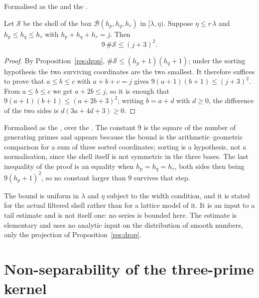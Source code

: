 \documentclass[11pt]{article}
\newcommand{\lo}{\lambda}
\newcommand{\hi}{\eta}
\begin{document}
\noindent Formalised as the
 and the
.

\begin{theorem}\label{res:shell}
Let $\mathcal S$ be the shell of the box $\mathcal B(h_p,h_q,h_r)$ in
$[\lo,\hi)$.  Suppose $\hi\le r\,\lo$ and $h_p\le h_q\le h_r$ with
$h_p+h_q+h_r=j$.  Then
\[
 9\,\#\mathcal S\le(j+3)^{2}.
\]
\end{theorem}

\begin{proof}
By Proposition~\ref{res:drop}, $\#\mathcal S\le(h_p+1)(h_q+1)$; under the
sorting hypothesis the two surviving coordinates are the two smallest.  It
therefore
suffices to prove that $a\le b\le c$ with $a+b+c=j$ gives
$9(a+1)(b+1)\le(j+3)^{2}$.  From $a\le b\le c$ we get $a+2b\le j$, so it is
enough that $9(a+1)(b+1)\le(a+2b+3)^{2}$; writing $b=a+d$ with $d\ge0$, the
difference of the two sides is $d(3a+4d+3)\ge0$.
\end{proof}

\noindent Formalised as the
, over the
.  The constant $9$ is the square of the number of
generating primes and appears because the bound is the arithmetic--geometric
comparison for a sum of three sorted coordinates; sorting is a hypothesis, not
a normalisation, since the shell itself is not symmetric in the three bases.
The last inequality of the proof is an equality when $h_p=h_q=h_r$, both sides
then being $9(h_p+1)^{2}$, so no constant larger than $9$ survives that step.

The bound is uniform in $\lo$ and $\hi$ subject to the width condition, and it
is stated for the actual filtered shell rather than for a lattice model of it.
It is an input to a tail estimate and is not itself one: no series is bounded
here.  The estimate is elementary and uses no analytic input on the
distribution of smooth numbers, only the projection of
Proposition~\ref{res:drop}.

\section{Non-separability of the three-prime kernel}\label{sec:rank}
\end{document}
